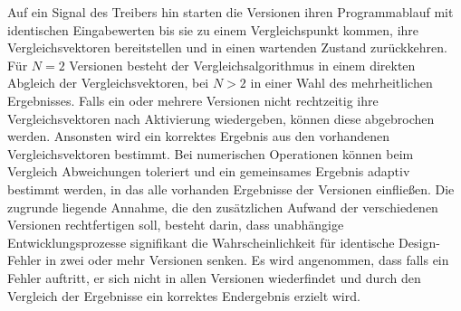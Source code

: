 Auf ein Signal des Treibers hin starten die Versionen ihren Programmablauf mit identischen Eingabewerten bis sie zu einem Vergleichspunkt kommen, ihre Vergleichsvektoren bereitstellen und in einen wartenden Zustand zurückkehren.
Für $N = 2$ Versionen besteht der Vergleichsalgorithmus in einem direkten Abgleich der Vergleichsvektoren, bei $N > 2$ in einer Wahl des mehrheitlichen Ergebnisses. Falls ein oder mehrere Versionen nicht rechtzeitig ihre Vergleichsvektoren nach Aktivierung wiedergeben, können diese abgebrochen werden. Ansonsten wird ein korrektes Ergebnis aus den vorhandenen Vergleichsvektoren bestimmt. Bei numerischen Operationen können beim Vergleich Abweichungen toleriert und ein gemeinsames Ergebnis adaptiv bestimmt werden, in das alle vorhanden Ergebnisse der Versionen einfließen. 
Die zugrunde liegende Annahme, die den zusätzlichen Aufwand der verschiedenen Versionen rechtfertigen soll, besteht darin, dass unabhängige Entwicklungsprozesse signifikant die Wahrscheinlichkeit für identische Design-Fehler in zwei oder mehr Versionen senken.
Es wird angenommen, dass falls ein Fehler auftritt, er sich nicht in allen Versionen wiederfindet und durch den Vergleich der Ergebnisse ein korrektes Endergebnis erzielt wird.
%
%
